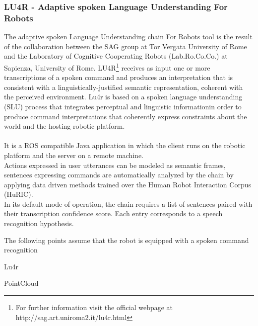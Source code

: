\subsubsection{LU4R - Adaptive spoken Language Understanding For Robots}
The adaptive spoken Language Understanding chain For Robots tool is the result of the collaboration between the SAG group at Tor Vergata University of Rome and the Laboratory of Cognitive Cooperating Robots (Lab.Ro.Co.Co.) at Sapienza, University of Rome. LU4R\footnote{For further information visit the official webpage at http://sag.art.uniroma2.it/lu4r.html} receives as input one or more transcriptions of a spoken command and produces an interpretation that is consistent with a linguistically-justified semantic representation, coherent with the perceived environment. Lu4r is based on a spoken language understanding (SLU) process that integrates perceptual and linguistic informationin order to produce command interpretations that coherently express constraints about the world and the hosting robotic platform.\\
\\
It is a ROS compatible Java application in which the client runs on the robotic platform and the server on a remote machine.\\
Actions expressed in user utterances can be modeled as semantic frames, sentences expressing commands are automatically analyzed by the chain by applying data driven methods trained over the Human Robot Interaction Corpus (HuRIC)\cite{bib3}.
\\
In its default mode of operation, the chain requires a list of sentences paired with their transcription confidence score. Each entry corresponds to a speech recognition hypothesis. 





The following points assume that the robot is equipped with a spoken command recognition

Lu4r

PointCloud